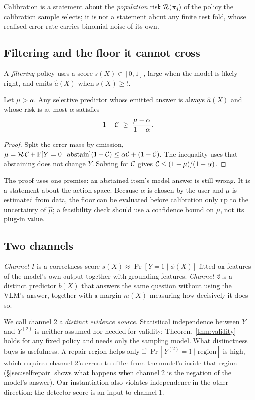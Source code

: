 Calibration is a statement about the \emph{population} risk $\mathcal{R}(\pi_{\hat\jmath})$ of the policy
the calibration sample selects; it is not a statement about any finite test fold, whose realised
error rate carries binomial noise of its own.

\subsection{Filtering and the floor it cannot cross}

A \emph{filtering} policy uses a score $s(X)\in[0,1]$, large when the model is likely right, and
emits $\hat a(X)$ when $s(X)\ge t$.

\begin{proposition}
\label{prop:floor}
Let $\mu>\alpha$. Any selective predictor whose emitted answer is always $\hat a(X)$ and whose risk
is at most $\alpha$ satisfies
\[
1-\Cov\ \ge\ \frac{\mu-\alpha}{1-\alpha}.
\]
\end{proposition}
\begin{proof}
Split the error mass by emission, $\mu=\mathcal{R}\,\mathcal{C}+\mathbb{P}[Y=0\mid\text{abstain}](1-\mathcal{C})\le\alpha\mathcal{C}+(1-\mathcal{C})$.
The inequality uses that abstaining does not change $Y$. Solving for $\mathcal{C}$ gives
$\mathcal{C}\le(1-\mu)/(1-\alpha)$.
\end{proof}

The proof uses one premise: an abstained item's model answer is still wrong. It is a statement about
the action space. Because $\alpha$ is chosen by the user and $\mu$ is estimated from data, the
floor can be evaluated before calibration only up to the uncertainty of $\hat\mu$; a feasibility
check should use a confidence bound on $\mu$, not its plug-in value.

\subsection{Two channels}

\begin{definition}[Channels]
\label{def:channels}
\emph{Channel 1} is a correctness score $s(X)\approx\Pr[Y=1\mid\phi(X)]$ fitted on features of the
model's own output together with grounding features. \emph{Channel 2} is a distinct predictor
$b(X)$ that answers the same question without using the VLM's answer, together with a margin
$m(X)$ measuring how decisively it does so.
\end{definition}

We call channel 2 a \emph{distinct evidence source}. Statistical independence between $Y$ and
$Y^{(2)}$ is neither assumed nor needed for validity: Theorem~\ref{thm:validity} holds for any
fixed policy and needs only the sampling model. What distinctness buys is usefulness. A repair
region helps only if $\Pr[Y^{(2)}=1\mid\text{region}]$ is high, which requires channel 2's errors to
differ from the model's inside that region (\S\ref{sec:selfrepair} shows what happens when channel 2
is the negation of the model's answer). Our instantiation also violates independence in the
other direction: the detector score is an input to channel 1.

